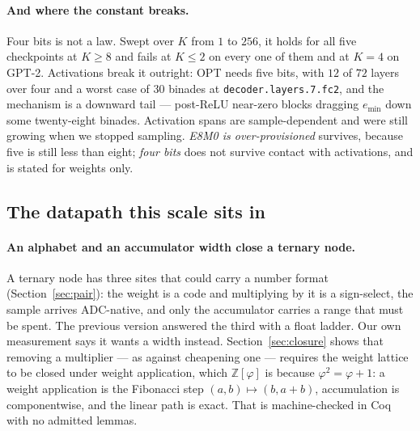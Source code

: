 \documentclass[11pt]{article}
\theoremstyle{definition}
\begin{document}
\paragraph{And where the constant breaks.} Four bits is not a law. Swept over
$K$ from $1$ to $256$, it holds for all five checkpoints at $K \geq 8$ and
fails at $K \leq 2$ on every one of them and at $K=4$ on GPT-2. Activations
break it outright: OPT needs five bits, with $12$ of $72$ layers over four and
a worst case of $30$ binades at \texttt{decoder.layers.7.fc2}, and the
mechanism is a downward tail --- post-ReLU near-zero blocks dragging $e_{\min}$
down some twenty-eight binades. Activation spans are sample-dependent and were
still growing when we stopped sampling. \emph{E8M0 is over-provisioned}
survives, because five is still less than eight; \emph{four bits} does not
survive contact with activations, and is stated for weights only.

\subsection*{The datapath this scale sits in}

\paragraph{An alphabet and an accumulator width close a ternary node.} A
ternary node has three sites that could carry a number format
(Section~\ref{sec:pair}): the weight is a code and multiplying by it is a
sign-select, the sample arrives ADC-native, and only the accumulator carries a
range that must be spent. The previous version answered the third with a float
ladder. Our own measurement says it wants a width instead.
Section~\ref{sec:closure} shows that removing a multiplier --- as against
cheapening one --- requires the weight lattice to be closed under weight
application, which $\mathbb{Z}[\varphi]$ is because $\varphi^{2}=\varphi+1$: a
weight application is the Fibonacci step $(a,b)\mapsto(b,a+b)$, accumulation is
componentwise, and the linear path is exact. That is machine-checked in Coq
with no admitted lemmas.
\end{document}
